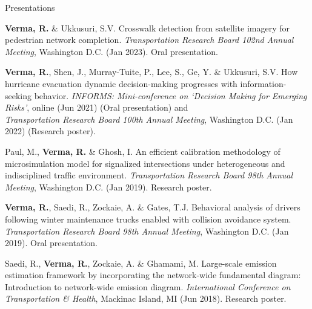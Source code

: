 \documentclass{CV} %
\begin{document}
\begin{rSection}{Presentations}
\begin{etaremune}
        \item \textbf{Verma, R.} \& Ukkusuri, S.V. Crosswalk detection from satellite imagery for pedestrian network completion. \textit{Transportation Research Board 102nd Annual Meeting}, Washington D.C. (Jan 2023). Oral presentation.

        \item \textbf{Verma, R.}, Shen, J., Murray-Tuite, P., Lee, S., Ge, Y. \& Ukkusuri, S.V. How hurricane evacuation dynamic decision-making progresses with information-seeking behavior. \textit{INFORMS: Mini-conference on `Decision Making for Emerging Risks'}, online (Jun 2021) (Oral presentation) and
        \\ \textit{Transportation Research Board 100th Annual Meeting}, Washington D.C. (Jan 2022) (Research poster).
    
        \item Paul, M., \textbf{Verma, R.} \& Ghosh, I. An efficient calibration methodology of microsimulation model for signalized intersections under heterogeneous and indisciplined traffic environment. \textit{Transportation Research Board 98th Annual Meeting}, Washington D.C. (Jan 2019). Research poster.
        
        \item \textbf{Verma, R.}, Saedi, R., Zockaie, A. \& Gates, T.J. Behavioral analysis of drivers following winter maintenance trucks enabled with collision avoidance system. \textit{Transportation Research Board 98th Annual Meeting}, Washington D.C. (Jan 2019). Oral presentation.

        \item Saedi, R., \textbf{Verma, R.}, Zockaie, A. \& Ghamami, M. Large-scale emission estimation framework by incorporating the network-wide fundamental diagram: Introduction to network-wide emission diagram. \textit{International Conference on Transportation \& Health}, Mackinac Island, MI (Jun 2018). Research poster.
    \end{etaremune}
\end{rSection}
\end{document}

